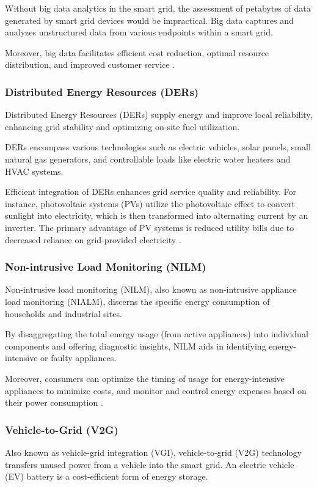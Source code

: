 Without big data analytics in the smart grid, the assessment of petabytes of data generated by smart grid devices would be impractical. Big data captures and analyzes unstructured data from various endpoints within a smart grid.

Moreover, big data facilitates efficient cost reduction, optimal resource distribution, and improved customer service \cite{WhatIsSmartgrid}.
\subsubsection{Distributed Energy Resources (DERs)}
Distributed Energy Resources (DERs) supply energy and improve local reliability, enhancing grid stability and optimizing on-site fuel utilization.

DERs encompass various technologies such as electric vehicles, solar panels, small natural gas generators, and controllable loads like electric water heaters and HVAC systems.

Efficient integration of DERs enhances grid service quality and reliability. For instance, photovoltaic systems (PVs) utilize the photovoltaic effect to convert sunlight into electricity, which is then transformed into alternating current by an inverter. The primary advantage of PV systems is reduced utility bills due to decreased reliance on grid-provided electricity \cite{WhatIsSmartgrid}.
\subsubsection{Non-intrusive Load Monitoring (NILM)}
Non-intrusive load monitoring (NILM), also known as non-intrusive appliance load monitoring (NIALM), discerns the specific energy consumption of households and industrial sites.

By disaggregating the total energy usage (from active appliances) into individual components and offering diagnostic insights, NILM aids in identifying energy-intensive or faulty appliances.

Moreover, consumers can optimize the timing of usage for energy-intensive appliances to minimize costs, and monitor and control energy expenses based on their power consumption \cite{WhatIsSmartgrid}. 
\subsubsection{Vehicle-to-Grid (V2G)}
Also known as vehicle-grid integration (VGI), vehicle-to-grid (V2G) technology transfers unused power from a vehicle into the smart grid. An electric vehicle (EV) battery is a cost-efficient form of energy storage.


